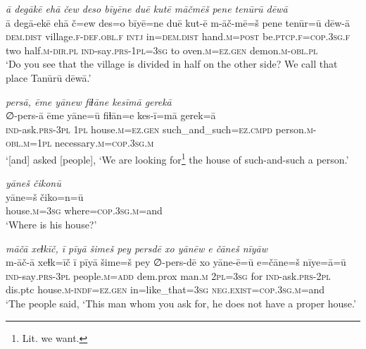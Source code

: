 \ea \label{ZP.74}
\textit{ā degākē ehā čew deso bīyēne duē kutē māčmēš pene tenūrū dēwā} \\ 
\gll ā degā-ekē ehā č=ew des=o bīyē=ne duē kut-ē m-āč-mē=š pene tenūr=ū dēw-ā \\ 
 \textsc{dem.dist} village\textsc{.f}\textsc{-def}\textsc{.obl}\textsc{.f} \textsc{intj} in=\textsc{dem.dist} hand\textsc{.m}\textsc{=\textsc{post}} be\textsc{.ptcp}\textsc{.f}\textsc{=cop}\textsc{.3sg}\textsc{.f} two half\textsc{.m}\textsc{-dir}\textsc{.pl} \textsc{ind-}say\textsc{.prs}\textsc{-1pl}\textsc{=3sg} to oven\textsc{.m}\textsc{\textsc{=ez.gen}} demon\textsc{.m}\textsc{-obl}\textsc{.pl} \\ 
\glt `Do you see that the village is divided in half on the other side? We call that place Tanūrū dēwā.'
\z 
 
\ea \label{ZP.84}
\textit{persā, ēme yānew fiɫāne kesīmā gerekā} \\ 
\gll ∅-pers-ā ēme yāne=ū fiɫān=e kes-ī=mā gerek=ā \\ 
 \textsc{ind-}ask\textsc{.prs}\textsc{-3pl} \textsc{1pl} house\textsc{.m}\textsc{\textsc{=ez.gen}} such\_and\_such\textsc{=ez}\textsc{.cmpd} person\textsc{.m}\textsc{-obl}\textsc{.m}\textsc{=1pl} necessary\textsc{.m}\textsc{=cop}\textsc{.3sg}\textsc{.m} \\ 
\glt `[and] asked [people], ‘We are looking for\footnote{Lit. we want.} the house of such-and-such a person.'
\z 
 
\ea \label{ZP.85}
\textit{yāneš čikonū} \\ 
\gll yāne=š čiko=n=ū \\ 
 house\textsc{.m}\textsc{=3sg} where\textsc{=cop}\textsc{.3sg}\textsc{.m}=and \\ 
\glt `Where is his house?'
\z 
 
\ea \label{ZP.86}
\textit{māčā xeɫkīč, ī pīyā šimeš pey persdē xo yānēw e čāneš nīyāw} \\ 
\gll m-āč-ā xeɫk=īč ī pīyā šime=š pey ∅-pers-dē xo yāne-ē=ū e=čāne=š nīye=ā=ū \\ 
 \textsc{ind-}say\textsc{.prs}\textsc{-3pl} people\textsc{.m}\textsc{=add} dem.prox man\textsc{.m} \textsc{2pl}\textsc{=3sg} for \textsc{ind-}ask\textsc{.prs}-\textsc{2pl} dis.ptc house\textsc{.m}\textsc{-indf}\textsc{\textsc{=ez.gen}} in=like\_that\textsc{=3sg} \textsc{\textsc{neg.}exist}\textsc{=cop}\textsc{.3sg}\textsc{.m}=and \\ 
\glt `The people said, ‘This man whom you ask for, he does not have a proper house.'
\z 
 
